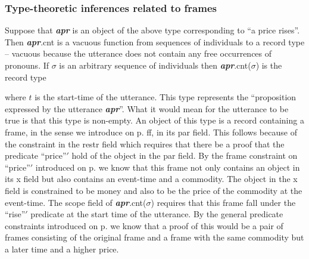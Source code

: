 \subsubsection{Type-theoretic inferences related to frames}  
Suppose that \textbf{\textit{apr}} is an object of the above type
corresponding to ``a price rises''.  Then \textbf{\textit{apr}}.cnt is
a vacuous function from sequences of individuals to a record type --
vacuous because the utterance does not contain any free occurrences of
pronouns.  If $\sigma$ is an arbitrary sequence of individuals then
\textbf{\textit{apr}}.cnt($\sigma$) is the record type
\begin{quote}
\end{quote} 
where $t$ is the start-time of the utterance.  This type represents
the ``proposition expressed by the utterance \textbf{\textit{apr}}''.
What it would mean for the utterance to be true is that this type is
non-empty.  An object of this type is a record containing a frame, in the sense we
introduce on p. \pageref{pg:frame}ff, in its par field. This follows
because of the constraint in the restr field which requires that there
be a proof that the predicate ``price''$'$ hold of the object in the
par field.  By the frame constraint on ``price''$'$ introduced on
p. \pageref{pg:frameconstraints} we know that this frame not only
contains an object in its x field but also contains an event-time and
a commodity.  The object in the x field is constrained to be money and
also to be the price of the commodity at the event-time.  The scope
field of \textbf{\textit{apr}}.cnt($\sigma$) requires that this frame
fall under the ``rise''$'$ predicate at the start time of the
utterance.  By the general predicate constraints introduced on
p. \pageref{pg:predconstraints} we know that a proof of this would be
a pair of frames consisting of the original frame and a frame with the
same commodity but a later time and a higher price.

